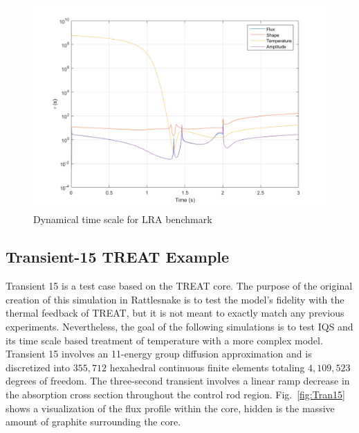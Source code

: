 \documentclass{anstrans}
\newcommand{\fig}[1]{Fig.~\ref{#1}}                      %
\begin{document}
\begin{figure}[htbp!]
\centering
\includegraphics[width=\linewidth]{time_constant_lra.png}
\caption{Dynamical time scale for LRA benchmark}
\label{fig:LRAtc}
\end{figure}


\subsection{Transient-15 TREAT Example}

Transient 15 is a test case based on the TREAT core. The purpose of the original creation of this simulation in Rattlesnake is to test the model's fidelity with the thermal feedback of TREAT, but it is not meant to exactly match any previous experiments.  Nevertheless, the goal of the following simulations is to test IQS and its time scale based treatment of temperature with a more complex model. Transient 15 involves an 11-energy group diffusion approximation and is discretized into $355,712$ hexahedral continuous finite elements totaling $4,109,523$ degrees of freedom.  The three-second transient involves a linear ramp decrease in the absorption cross section throughout the control rod region. \fig{fig:Tran15} shows a visualization of the flux profile within the core, hidden is the massive amount of graphite surrounding the core.   
\end{document}
